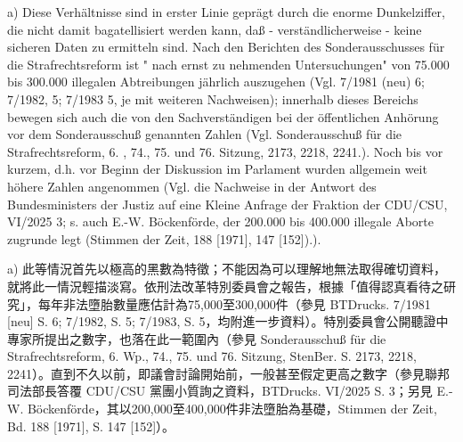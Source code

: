 \documentclass[12pt]{article}
\begin{document}
\syncleft
\begin{sourcepara}
a) Diese Verhältnisse sind in erster Linie geprägt durch die enorme Dunkelziffer, die nicht damit bagatellisiert werden kann, daß - verständlicherweise - keine sicheren Daten zu ermitteln sind. Nach den Berichten des Sonderausschusses für die Strafrechtsreform ist " nach ernst zu nehmenden Untersuchungen" von 75.000 bis 300.000 illegalen Abtreibungen jährlich auszugehen (Vgl. \abbrBTDrucks{} 7/1981 (neu) \abbrS{}6; 7/1982, \abbrS{} 5; 7/1983 \abbrS{} 5, je mit weiteren Nachweisen); innerhalb dieses Bereichs bewegen sich auch die von den Sachverständigen bei der öffentlichen Anhörung vor dem Sonderausschuß genannten Zahlen (Vgl. Sonderausschuß für die Strafrechtsreform, 6. \abbrWp{}, 74., 75. und 76. Sitzung, \abbrStenBer{} \abbrS{} 2173, 2218, 2241.). Noch bis vor kurzem, d.h. vor Beginn der Diskussion im Parlament wurden allgemein weit höhere Zahlen angenommen (Vgl. die Nachweise in der Antwort des Bundesministers der Justiz auf eine Kleine Anfrage der Fraktion der CDU/CSU, \abbrBTDrucks{} VI/2025 \abbrS{} 3; s. auch E.-W. Böckenförde, der 200.000 bis 400.000 illegale Aborte zugrunde legt (Stimmen der Zeit, \abbrBd{} 188 [1971], \abbrS{} 147 [152]).).
\end{sourcepara}
\begin{transpara}
a) 此等情況首先以極高的黑數為特徵；不能因為可以理解地無法取得確切資料，就將此一情況輕描淡寫。依刑法改革特別委員會之報告，根據「值得認真看待之研究」，每年非法墮胎數量應估計為75,000至300,000件（參見 BTDrucks. 7/1981 [neu] S. 6; 7/1982, S. 5; 7/1983, S. 5，均附進一步資料）。特別委員會公開聽證中專家所提出之數字，也落在此一範圍內（參見 Sonderausschuß für die Strafrechtsreform, 6. Wp., 74., 75. und 76. Sitzung, StenBer. S. 2173, 2218, 2241）。直到不久以前，即議會討論開始前，一般甚至假定更高之數字（參見聯邦司法部長答覆 CDU/CSU 黨團小質詢之資料，BTDrucks. VI/2025 S. 3；另見 E.-W. Böckenförde，其以200,000至400,000件非法墮胎為基礎，Stimmen der Zeit, Bd. 188 [1971], S. 147 [152]）。
\end{transpara}
\end{document}
